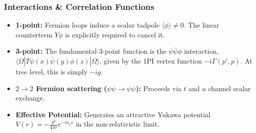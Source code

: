 \documentclass{article}
\begin{document}
\subsubsection*{Interactions \& Correlation Functions}
\begin{itemize}
    \item \textbf{1-point:} Fermion loops induce a scalar tadpole $\langle \phi \rangle \neq 0$. The linear counterterm $Y\phi$ is explicitly required to cancel it.
    \item \textbf{3-point:} The fundamental 3-point function is the $\psi\bar{\psi}\phi$ interaction, $\langle \Omega | T \psi(x) \bar{\psi}(y) \phi(z) | \Omega \rangle$, given by the 1PI vertex function $-i\Gamma(p',p)$. At tree level, this is simply $-ig$.
    \item \textbf{$2 \to 2$ Fermion scattering ($\psi \psi \to \psi \psi$):} Proceeds via $t$ and $u$ channel scalar exchange.
    \item \textbf{Effective Potential:} Generates an attractive Yukawa potential $V(r) = -\frac{g^2}{4\pi r}e^{-m_s r}$ in the non-relativistic limit.
\end{itemize}
\end{document}
